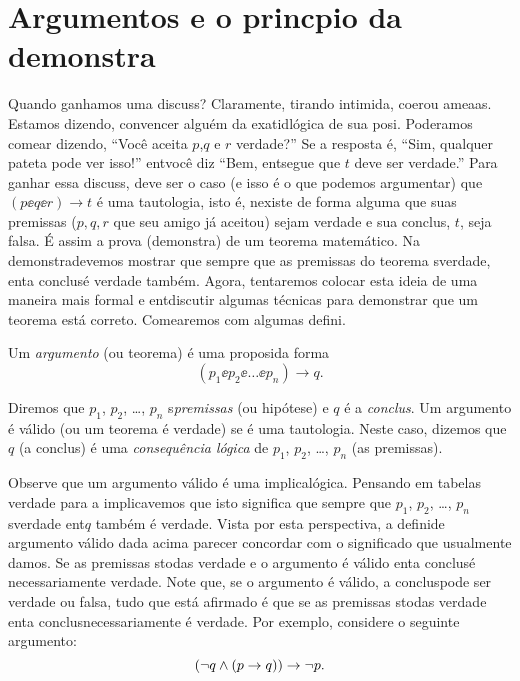 \section{Argumentos e o princ\ih pio da demonstra\cao}\label{demonstracao}

Quando ganhamos uma discuss\aoi? Claramente, tirando intimida\caoi, coer\cao ou amea\cc as. Estamos dizendo, convencer algu\'em da exatid\ao l\'ogica de sua posi\caoi. Poder\ih amos come\cc ar dizendo, ``Voc\^e aceita $p$,$q$ e $r$ verdade?'' Se a resposta \'e, ``Sim, qualquer pateta pode ver isso!'' ent\ao voc\^e diz ``Bem, ent\ao segue que $t$ deve ser verdade.'' Para ganhar essa discuss\aoi, deve ser o caso (e isso \'e o que podemos argumentar) que $(p\ee q\ee r)\to t$ \'e uma tautologia, isto \'e, n\ao existe de forma alguma que suas premissas ($p,q,r$ que seu amigo j\'a aceitou) sejam verdade e sua conclus\aoi, $t$, seja falsa. \'E assim a prova (demonstra\caoi) de um teorema matem\'atico. Na demonstra\cao devemos mostrar que sempre que as premissas do teorema s\ao verdade, ent\ao a conclus\ao \'e verdade tamb\'em. Agora, tentaremos colocar esta ideia de uma maneira mais formal e ent\ao discutir algumas t\'ecnicas para demonstrar que um teorema est\'a correto. Come\cc aremos com algumas defini\cois. 

Um \emph{argumento} (ou teorema) \'e uma proposi\cao da forma
\[
(p_1\ee p_2\ee \ldots \ee p_n)\to q.
\] 

Diremos que $p_1$, $p_2$, \ldots, $p_n$ s\ao \emph{premissas} (ou hip\'otese) e $q$ \'e a \emph{conclus\aoi}. Um argumento \'e v\'alido (ou um teorema \'e verdade) se \'e uma tautologia. Neste caso, dizemos que $q$ (a conclus\aoi) \'e uma \emph{consequ\^encia l\'ogica} de $p_1$, $p_2$, \ldots, $p_n$ (as premissas). 

Observe que um argumento v\'alido \'e uma implica\cao l\'ogica. Pensando em tabelas verdade para a implica\cao vemos que isto significa que sempre que $p_1$, $p_2$, \ldots, $p_n$ s\ao verdade ent\ao $q$ tamb\'em \'e verdade. Vista por esta perspectiva, a defini\cao de argumento v\'alido dada acima parecer concordar com o significado que usualmente damos. Se as premissas s\ao todas verdade e o argumento \'e v\'alido ent\ao a conclus\ao \'e necessariamente verdade. Note que, se o argumento \'e v\'alido, a conclus\ao pode ser verdade ou falsa, tudo que est\'a afirmado \'e que se as premissas s\ao todas verdade ent\ao a conclus\ao necessariamente \'e verdade. Por exemplo, considere o seguinte argumento:
\[
(\lnot q \wedge (p\to q))\to \lnot p.
\]

